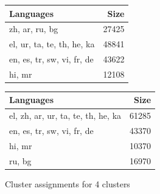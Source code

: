 \begin{figure}[ht]
    \centering
    
    \begin{subtable}{0.49\textwidth}
        \centering
        \begin{tabular}{lr}
            \toprule
            Languages & Size \\
            \midrule
            zh, ar, ru, bg & 27425 \\
            el, ur, ta, te, th, he, ka & 48841 \\
            en, es, tr, sw, vi, fr, de & 43622 \\
            hi, mr & 12108 \\
            \bottomrule
        \end{tabular}
        \caption{\citet{chung_improving_2020}}
        \label{tab:chung_clusters_k4}
        

    \end{subtable}
    \hfill
    \begin{subtable}{0.49\textwidth}
        \centering
        \begin{tabular}{lr}
        \toprule
        Languages & Size \\
        \midrule
        el, zh, ar, ur, ta, te, th, he, ka & 61285 \\
        en, es, tr, sw, vi, fr, de & 43370 \\
        hi, mr & 10370 \\
        ru, bg & 16970 \\
        \bottomrule
        \end{tabular}
        \caption{\citet{liang_xlm-v_2023}}
        \label{tab:liang_clusters_k4}
    \end{subtable}

    \caption{Cluster assignments for 4 clusters}
    \label{fig:multiple_tables}
\end{figure}

